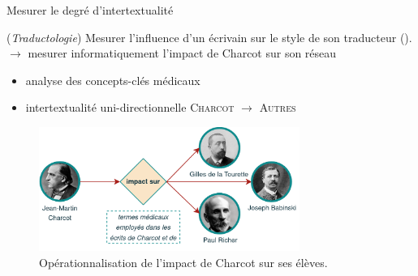 \begin{frame}{Mesurer le degré d'intertextualité}

{\small(\textit{Traductologie}) Mesurer l'influence d'un écrivain sur le style de son traducteur {\footnotesize(\cite{oseki2007})}.}
\\
$\rightarrow$ mesurer informatiquement l'impact de Charcot sur son réseau
\begin{itemize}
\item analyse des concepts-clés médicaux
\item intertextualité uni-directionnelle {\small\textsc{Charcot}} $\rightarrow$ {\small\textsc{Autres}}
\end{itemize}
\begin{figure}[!h]
    \centering
\includegraphics[width=85mm,scale=0.5]{pic/charcot_intertextualite.png}
    \caption{Opérationnalisation de l'impact de Charcot sur ses élèves.}
    \label{fig:my_label}
\end{figure}
\end{frame}

